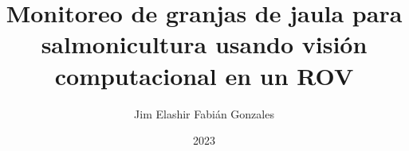 \documentclass[a4paper,12pt,oneside]{tesisutec}
\begin{document}
\frontmatter

\department{}

\title{Monitoreo de granjas de jaula para salmonicultura usando visión computacional en un ROV}

\author{Jim Elashir Fabián Gonzales } %

\date{2023}

\maketitle



% 
% 

\tableofcontents

\newpage


\newpage



\mainmatter
\pagestyle{fancy}

% 
%  



% 
% 
% 

\renewcommand{\bibname}{\hfill\Large\bf{REFERENCIAS BIBLIOGRÁFICAS}\hfill}



% 
\end{document}
